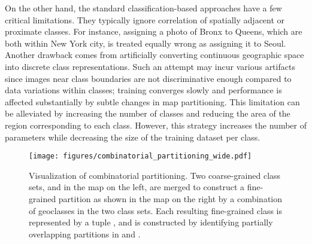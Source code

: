 \documentclass[runningheads]{llncs}
\begin{document}
On the other hand, the standard classification-based approaches have a few critical limitations.
They typically ignore correlation of spatially adjacent or proximate classes.
For instance, assigning a photo of Bronx to Queens, which are both within New York city, is treated equally wrong as assigning it to Seoul.
Another drawback comes from artificially converting continuous geographic space into discrete class representations.
Such an attempt may incur various artifacts since images near class boundaries are not discriminative enough compared to data variations within classes; training converges slowly and 
performance is affected substantially by subtle changes in map partitioning.
This limitation can be alleviated by increasing the number of classes and reducing the area of the region corresponding to each class.
However, this strategy increases the number of parameters while decreasing the size of the training dataset per class.


\begin{figure}[t]
\centering
\texttt{[image: figures/combinatorial\_partitioning\_wide.pdf]}
\caption{
Visualization of combinatorial partitioning. 
Two coarse-grained class sets,  and  in the map on the left, are merged to construct a fine-grained partition as shown in the map on the right by a combination of geoclasses in the two class sets.
Each resulting fine-grained class is represented by a tuple , and is constructed by identifying partially overlapping partitions in  and .
}
\label{fig:comb_part}
\end{figure}


\iffalse
discretizations introduce upper-bounds of the model by predicting the identical geolocation for images assigned to the same class.
Although the upper-bounds can be mitigated by increasing the number of output classes, it is not always easy as it will increase the number of parameters linearly.
Moreover, the training example per each class will be reduced as the number of classes increases and it will end up with an equivalent of the retrieval based model when the number of classes becomes equal to the number of examples in the dataset.
\fi
\end{document}
